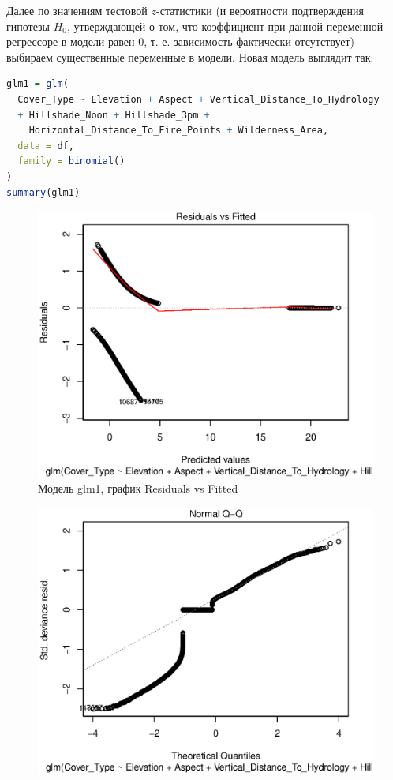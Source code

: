\documentclass[12pt]{article}
\begin{document}
Далее по значениям тестовой $z$-статистики (и вероятности подтверждения гипотезы $H_0$, утверждающей о том, что коэффициент при
данной переменной-регрессоре в модели равен 0, т. е. зависимость фактически отсутствует) выбираем существенные переменные в модели.
Новая модель выглядит так:
\begin{lstlisting}[language=r]
glm1 = glm(
  Cover_Type ~ Elevation + Aspect + Vertical_Distance_To_Hydrology
  + Hillshade_Noon + Hillshade_3pm +
    Horizontal_Distance_To_Fire_Points + Wilderness_Area,
  data = df,
  family = binomial()
)
summary(glm1)
\end{lstlisting}
\begin{multicols}{1}
\begin{figure}[H]
\centering
\includegraphics[width=0.9\linewidth]{glm1_1}
\caption{Модель glm1, график Residuals vs Fitted}
\label{fig:glm1_1}
\end{figure}
\begin{figure}[H]
\centering
\includegraphics[width=0.9\linewidth]{glm1_2}

\end{figure}
\end{multicols}
\end{document}
